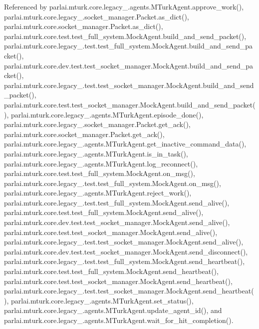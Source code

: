 Referenced by parlai.\+mturk.\+core.\+legacy\+\_.\+agents.\+M\+Turk\+Agent.\+approve\+\_\+work(), parlai.\+mturk.\+core.\+legacy\+\_.\+socket\+\_\+manager.\+Packet.\+as\+\_\+dict(), parlai.\+mturk.\+core.\+socket\+\_\+manager.\+Packet.\+as\+\_\+dict(), parlai.\+mturk.\+core.\+test.\+test\+\_\+full\+\_\+system.\+Mock\+Agent.\+build\+\_\+and\+\_\+send\+\_\+packet(), parlai.\+mturk.\+core.\+legacy\+\_.\+test.\+test\+\_\+full\+\_\+system.\+Mock\+Agent.\+build\+\_\+and\+\_\+send\+\_\+packet(), parlai.\+mturk.\+core.\+dev.\+test.\+test\+\_\+socket\+\_\+manager.\+Mock\+Agent.\+build\+\_\+and\+\_\+send\+\_\+packet(), parlai.\+mturk.\+core.\+legacy\+\_.\+test.\+test\+\_\+socket\+\_\+manager.\+Mock\+Agent.\+build\+\_\+and\+\_\+send\+\_\+packet(), parlai.\+mturk.\+core.\+test.\+test\+\_\+socket\+\_\+manager.\+Mock\+Agent.\+build\+\_\+and\+\_\+send\+\_\+packet(), parlai.\+mturk.\+core.\+legacy\+\_.\+agents.\+M\+Turk\+Agent.\+episode\+\_\+done(), parlai.\+mturk.\+core.\+legacy\+\_.\+socket\+\_\+manager.\+Packet.\+get\+\_\+ack(), parlai.\+mturk.\+core.\+socket\+\_\+manager.\+Packet.\+get\+\_\+ack(), parlai.\+mturk.\+core.\+legacy\+\_.\+agents.\+M\+Turk\+Agent.\+get\+\_\+inactive\+\_\+command\+\_\+data(), parlai.\+mturk.\+core.\+legacy\+\_.\+agents.\+M\+Turk\+Agent.\+is\+\_\+in\+\_\+task(), parlai.\+mturk.\+core.\+legacy\+\_.\+agents.\+M\+Turk\+Agent.\+log\+\_\+reconnect(), parlai.\+mturk.\+core.\+test.\+test\+\_\+full\+\_\+system.\+Mock\+Agent.\+on\+\_\+msg(), parlai.\+mturk.\+core.\+legacy\+\_.\+test.\+test\+\_\+full\+\_\+system.\+Mock\+Agent.\+on\+\_\+msg(), parlai.\+mturk.\+core.\+legacy\+\_.\+agents.\+M\+Turk\+Agent.\+reject\+\_\+work(), parlai.\+mturk.\+core.\+legacy\+\_.\+test.\+test\+\_\+full\+\_\+system.\+Mock\+Agent.\+send\+\_\+alive(), parlai.\+mturk.\+core.\+test.\+test\+\_\+full\+\_\+system.\+Mock\+Agent.\+send\+\_\+alive(), parlai.\+mturk.\+core.\+dev.\+test.\+test\+\_\+socket\+\_\+manager.\+Mock\+Agent.\+send\+\_\+alive(), parlai.\+mturk.\+core.\+test.\+test\+\_\+socket\+\_\+manager.\+Mock\+Agent.\+send\+\_\+alive(), parlai.\+mturk.\+core.\+legacy\+\_.\+test.\+test\+\_\+socket\+\_\+manager.\+Mock\+Agent.\+send\+\_\+alive(), parlai.\+mturk.\+core.\+dev.\+test.\+test\+\_\+socket\+\_\+manager.\+Mock\+Agent.\+send\+\_\+disconnect(), parlai.\+mturk.\+core.\+legacy\+\_.\+test.\+test\+\_\+full\+\_\+system.\+Mock\+Agent.\+send\+\_\+heartbeat(), parlai.\+mturk.\+core.\+test.\+test\+\_\+full\+\_\+system.\+Mock\+Agent.\+send\+\_\+heartbeat(), parlai.\+mturk.\+core.\+test.\+test\+\_\+socket\+\_\+manager.\+Mock\+Agent.\+send\+\_\+heartbeat(), parlai.\+mturk.\+core.\+legacy\+\_.\+test.\+test\+\_\+socket\+\_\+manager.\+Mock\+Agent.\+send\+\_\+heartbeat(), parlai.\+mturk.\+core.\+legacy\+\_.\+agents.\+M\+Turk\+Agent.\+set\+\_\+status(), parlai.\+mturk.\+core.\+legacy\+\_.\+agents.\+M\+Turk\+Agent.\+update\+\_\+agent\+\_\+id(), and parlai.\+mturk.\+core.\+legacy\+\_.\+agents.\+M\+Turk\+Agent.\+wait\+\_\+for\+\_\+hit\+\_\+completion().

